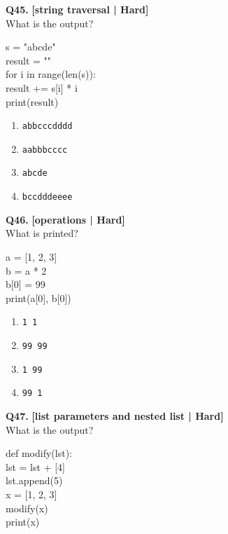\noindent\textbf{Q45.} \hfill {\small\color{LPUOrange}\textbf{[string traversal | Hard]}}\\[2pt]
What is the output? 

\begin{pycode}
s = "abcde"\\
result = ""\\
for i in range(len(s)):\\
result += s[i] * i\\
print(result)
\end{pycode}

\begin{enumerate}[label=(\alph*),topsep=2pt,itemsep=1pt,partopsep=0pt,parsep=0pt]
    \item \relax \texttt{abbcccdddd}
    \item \relax \texttt{aabbbcccc}
    \item \relax \texttt{abcde}
    \item \relax \texttt{bccdddeeee}
\end{enumerate}
\vspace{2mm}

\noindent\textbf{Q46.} \hfill {\small\color{LPUOrange}\textbf{[operations | Hard]}}\\[2pt]
What is printed? 

\begin{pycode}
a = [1, 2, 3]\\
b = a * 2\\
b[0] = 99\\
print(a[0], b[0])
\end{pycode}

\begin{enumerate}[label=(\alph*),topsep=2pt,itemsep=1pt,partopsep=0pt,parsep=0pt]
    \item \relax \texttt{1 1}
    \item \relax \texttt{99 99}
    \item \relax \texttt{1 99}
    \item \relax \texttt{99 1}
\end{enumerate}
\vspace{2mm}

\noindent\textbf{Q47.} \hfill {\small\color{LPUOrange}\textbf{[list parameters and nested list | Hard]}}\\[2pt]
What is the output? 

\begin{pycode}
def modify(lst):\\
lst = lst + [4]\\
lst.append(5)\\
x = [1, 2, 3]\\
modify(x)\\
print(x)
\end{pycode}


